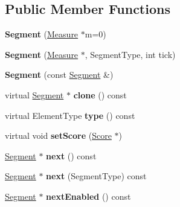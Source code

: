 \subsection*{Public Member Functions}
\begin{DoxyCompactItemize}
\item 
\mbox{\label{class_ms_1_1_segment_a3433e9b1c158570c08f989b544a05cc2}} 
{\bfseries Segment} (\hyperlink{class_ms_1_1_measure}{Measure} $\ast$m=0)
\item 
\mbox{\label{class_ms_1_1_segment_abe79d8cacc2011281f5761d7a9585608}} 
{\bfseries Segment} (\hyperlink{class_ms_1_1_measure}{Measure} $\ast$, Segment\+Type, int tick)
\item 
\mbox{\label{class_ms_1_1_segment_afdcd8458722693e1ce57e1a8fb4eeb00}} 
{\bfseries Segment} (const \hyperlink{class_ms_1_1_segment}{Segment} \&)
\item 
\mbox{\label{class_ms_1_1_segment_a6138aac0deb1b7846e0de5f799167592}} 
virtual \hyperlink{class_ms_1_1_segment}{Segment} $\ast$ {\bfseries clone} () const
\item 
\mbox{\label{class_ms_1_1_segment_a0306d7d3a0b0ae11c03feb3a45efef28}} 
virtual Element\+Type {\bfseries type} () const
\item 
\mbox{\label{class_ms_1_1_segment_a430e81e96ba903caa2572404e99cbf0c}} 
virtual void {\bfseries set\+Score} (\hyperlink{class_ms_1_1_score}{Score} $\ast$)
\item 
\mbox{\label{class_ms_1_1_segment_a1c4c00c6b1052c6c122f5fc665ec8a20}} 
\hyperlink{class_ms_1_1_segment}{Segment} $\ast$ {\bfseries next} () const
\item 
\mbox{\label{class_ms_1_1_segment_ad0ee4fbcb35085bdefc7b2c69d8dcfbf}} 
\hyperlink{class_ms_1_1_segment}{Segment} $\ast$ {\bfseries next} (Segment\+Type) const
\item 
\mbox{\label{class_ms_1_1_segment_a560efa5ed72325089f62eb7f27d600e8}} 
\hyperlink{class_ms_1_1_segment}{Segment} $\ast$ {\bfseries next\+Enabled} () const

\end{DoxyCompactItemize}

